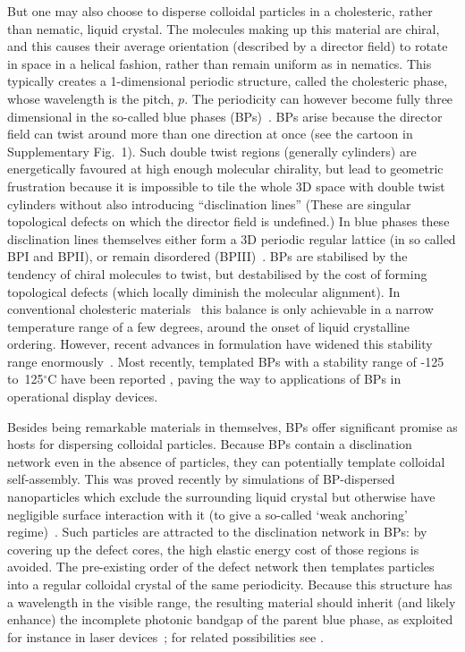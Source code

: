 \documentclass[12pt]{article}
\begin{document}
But one may also choose to disperse colloidal particles in a cholesteric, 
rather than nematic, liquid crystal. The molecules making up this material are
chiral, and this causes their average orientation (described by a director field) to rotate in space in
a helical fashion, rather than remain uniform as in nematics. 
This typically creates a 1-dimensional periodic structure, called the cholesteric phase, whose wavelength 
is the pitch, $p$. The periodicity can however become fully three dimensional in the so-called blue phases (BPs)~\cite{mermin}. BPs arise because the director field can twist around more than one direction at once (see 
the cartoon in Supplementary Fig.~1). Such double twist 
regions (generally cylinders) are energetically favoured at high enough molecular chirality, but
lead to geometric frustration because it is impossible to tile the whole 3D
space with double twist cylinders without also introducing ``disclination lines'' 
(These are singular topological defects on which the director field is 
undefined.) In blue phases these disclination lines themselves either form a 3D periodic regular lattice (in so called BPI and BPII), or remain disordered (BPIII)~\cite{bp3}. 
%
BPs are stabilised by the tendency of chiral molecules to twist, but destabilised by the cost of forming topological defects (which locally diminish the molecular alignment). In conventional cholesteric materials~\cite{mermin} this balance is only achievable in a narrow temperature range of a few degrees, around the onset of liquid crystalline ordering.
However, recent advances in formulation have widened this stability
range enormously~\cite{kikuchi,bplasers,coleswidetrange,bpdevice}. Most
recently, templated BPs with a stability range of -125
to~125$^\circ$C have been reported \cite{coles}, paving the way to
applications of BPs in operational display devices.

Besides being remarkable materials in themselves, BPs offer significant promise as hosts for dispersing colloidal particles. Because BPs contain a disclination network even in the absence of
particles, they can potentially template colloidal self-assembly. 
This was proved recently by simulations of BP-dispersed nanoparticles which 
exclude the surrounding liquid crystal but otherwise have negligible surface 
interaction with it (to give a so-called `weak anchoring' regime)~\cite{extrareference1,miha}. 
Such particles are attracted to the disclination network in BPs: by covering up the defect cores, the high elastic energy cost of those regions is avoided. The pre-existing order of the defect network then templates particles into a regular colloidal crystal of the same periodicity. 
Because this structure has a wavelength in the visible range, 
the resulting material should inherit (and likely enhance) the incomplete photonic bandgap of the parent blue phase, as exploited for instance in laser devices~\cite{bplasers}; for related possibilities see \cite{lavrentovich}.
\end{document}
